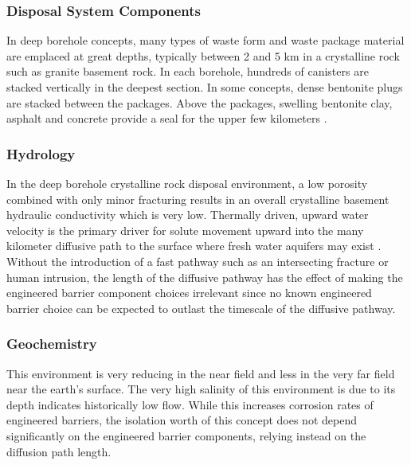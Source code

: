 

\subsubsection{Disposal System Components}

In deep borehole concepts, many types of  waste form and waste package material 
are emplaced at great depths, typically between 2 and 5 km 
\cite{hardin_generic_2011, clayton_generic_2011}
in a crystalline rock such as granite basement rock. In each borehole, hundreds
of canisters are stacked vertically in the deepest section. In some concepts, 
dense bentonite plugs are stacked between the packages. Above the packages, 
swelling bentonite clay, asphalt and concrete provide a seal for the upper few 
kilometers \cite{clayton_generic_2011}. 

\subsubsection{Hydrology}

In the deep borehole crystalline rock disposal environment, a low porosity
combined with only minor fracturing results in an overall crystalline basement
hydraulic conductivity which is very low. Thermally driven, upward water 
velocity is the primary driver for solute movement upward into the many 
kilometer diffusive path to the surface where fresh water aquifers may exist
\cite{clayton_generic_2011}.
Without the introduction of a fast pathway such as an intersecting fracture or 
human intrusion, the length of the diffusive pathway has the effect of making the 
engineered barrier component choices irrelevant since no known engineered 
barrier choice can be expected to outlast the timescale of the diffusive pathway.

\subsubsection{Geochemistry}

This environment is very reducing in the near field and less in the very 
far field near the earth's surface. The very high salinity of this environment
is due to its depth indicates historically low flow. While this increases 
corrosion rates of engineered barriers, the isolation worth of this concept 
does not depend significantly on the engineered barrier components, relying 
instead on the diffusion path length.  


